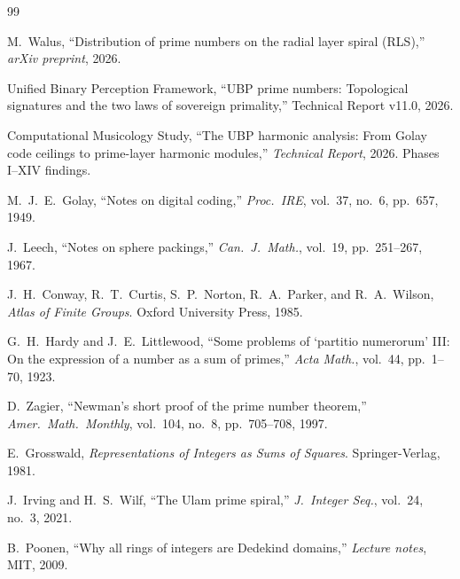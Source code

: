 \documentclass[11pt,a4paper]{article}
\theoremstyle{definition}
\begin{document}
\begin{thebibliography}{99}

M.~Walus, ``Distribution of prime numbers on the radial layer spiral (RLS),'' \emph{arXiv preprint}, 2026.

Unified Binary Perception Framework, ``UBP prime numbers: Topological signatures and the two laws of sovereign primality,'' Technical Report v11.0, 2026.

Computational Musicology Study, ``The UBP harmonic analysis: From Golay code ceilings to prime-layer harmonic modules,'' \emph{Technical Report}, 2026.
Phases I--XIV findings.

M.~J.~E.~Golay, ``Notes on digital coding,'' \emph{Proc.\ IRE}, vol.~37, no.~6, pp.~657, 1949.

J.~Leech, ``Notes on sphere packings,'' \emph{Can.\ J.\ Math.}, vol.~19, pp.~251--267, 1967.

J.~H.~Conway, R.~T.~Curtis, S.~P.~Norton, R.~A.~Parker, and R.~A.~Wilson, \emph{Atlas of Finite Groups}. Oxford University Press, 1985.

G.~H.~Hardy and J.~E.~Littlewood, ``Some problems of `partitio numerorum' III: On the expression of a number as a sum of primes,'' \emph{Acta Math.}, vol.~44, pp.~1--70, 1923.

D.~Zagier, ``Newman's short proof of the prime number theorem,'' \emph{Amer.\ Math.\ Monthly}, vol.~104, no.~8, pp.~705--708, 1997.

E.~Grosswald, \emph{Representations of Integers as Sums of Squares}. Springer-Verlag, 1981.

J.~Irving and H.~S.~Wilf, ``The Ulam prime spiral,'' \emph{J.\ Integer Seq.}, vol.~24, no.~3, 2021.

B.~Poonen, ``Why all rings of integers are Dedekind domains,'' \emph{Lecture notes}, MIT, 2009.

\end{thebibliography}
\end{document}
